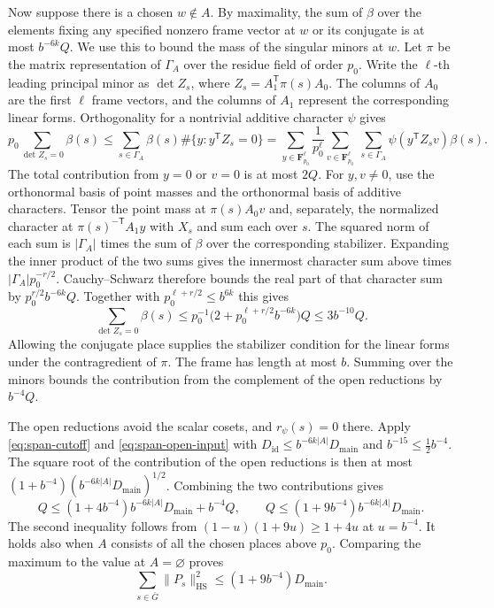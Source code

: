 Now suppose there is a chosen \(w\notin A\). By maximality, the sum of
\(\beta\) over the elements fixing any specified nonzero frame vector
at \(w\) or its conjugate is at most \(b^{-6k}Q\).
We use this to bound the mass of the singular minors at \(w\).
Let \(\pi\) be the matrix representation of \(\Gamma_A\) over the residue
field of order \(p_0\). Write the \(\ell\)-th leading principal minor as
\(\det Z_s\), where \(Z_s=A_1^{\mathsf T}\pi(s)A_0\). The columns of
\(A_0\) are the first \(\ell\) frame vectors, and the columns of \(A_1\)
represent the corresponding linear forms. Orthogonality for a nontrivial
additive character \(\psi\) gives
\[
 p_0 \sum_{\det Z_s=0}\beta(s)
 \le \sum_{s\in\Gamma_A}\beta(s)\#\{y:y^{\mathsf T}Z_s=0\}
 = \sum_{y\in\mathbf F_{p_0}^\ell}\frac{1}{p_0^\ell}
    \sum_{v\in\mathbf F_{p_0}^\ell}\ \sum_{s\in\Gamma_A}
        \psi(y^{\mathsf T}Z_s v)\beta(s).
\]
The total contribution from \(y=0\) or \(v=0\) is at most \(2Q\).
For \(y,v\ne0\), use the orthonormal basis of point masses and the
orthonormal basis of additive characters. Tensor the point mass at
\(\pi(s)A_0v\) and, separately, the normalized character at
\(\pi(s)^{-\mathsf T}A_1y\) with \(X_s\) and sum each over \(s\).
The squared norm of each sum is \(|\Gamma_A|\) times the sum of \(\beta\)
over the corresponding stabilizer. Expanding the inner product of the two
sums gives the innermost character sum above times \(|\Gamma_A|p_0^{-r/2}\).
Cauchy--Schwarz therefore bounds the real part of that character sum
by \(p_0^{r/2}b^{-6k}Q\). Together with \(p_0^{\ell+r/2}\le b^{6k}\)
this gives
\[
  \sum_{\det Z_s=0}\beta(s)
  \le p_0^{-1}\bigl(2+p_0^{\ell+r/2}b^{-6k}\bigr)Q
  \le 3b^{-10}Q .
\]
Allowing the conjugate place supplies the stabilizer condition for the
linear forms under the contragredient of \(\pi\).
The frame has length at most \(b\). Summing over the minors bounds the
contribution from the complement of the open reductions by \(b^{-4}Q\).

The open reductions avoid the scalar cosets, and \(r_\psi(s)=0\) there.
Apply \eqref{eq:span-cutoff} and \eqref{eq:span-open-input} with
\(D_{\mathrm{id}}\le b^{-6k|A|}D_{\mathrm{main}}\) and
\(b^{-15}\le\tfrac12 b^{-4}\). The square root of the contribution of the
open reductions is then at most
\((1+b^{-4})(b^{-6k|A|}D_{\mathrm{main}})^{1/2}\).
Combining the two contributions gives
\[
 Q \leq (1+4b^{-4})b^{-6k|A|}D_{\mathrm{main}}+b^{-4}Q,
 \qquad
 Q\leq (1+9b^{-4})b^{-6k|A|}D_{\mathrm{main}}.
\]
The second inequality follows from \((1-u)(1+9u)\ge1+4u\) at \(u=b^{-4}\).
It holds also when \(A\) consists of all the chosen places above \(p_0\).
Comparing the maximum to the value at \(A=\varnothing\) proves
\begin{equation}\label{eq:span-second-moment}
 \sum_{s\in\bar G}\|P_s\|_{\mathrm{HS}}^2
    \leq (1+9b^{-4})D_{\mathrm{main}}.
\end{equation}

